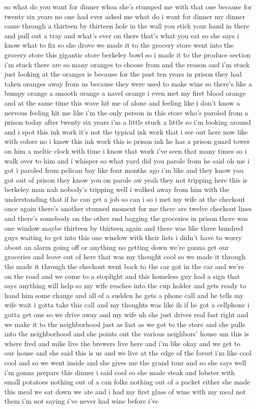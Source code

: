 so what do you want for dinner whoa she's stumped me with that one because for twenty six years no one had ever asked me what do i want for dinner my dinner came through a thirteen by thirteen hole in the wall you stick your hand in there and pull out a tray and what's ever on there that's what you eat so she says i know what to fix so she drove we made it to the grocery store went into the grocery store this gigantic store berkeley bowl so i made it to the produce section i'm stuck there are so many oranges to choose from and the reason and i'm stuck just looking at the oranges is because for the past ten years in prison they had taken oranges away from us because they were used to make wine so there's like a bumpy orange a smooth orange a navel orange i even met my first blood orange and at the same time this wave hit me of alone and feeling like i don't know a nervous feeling hit me like i'm the only person in this store who's paroled from a prison today after twenty six years i'm a little stuck a little so i'm looking around and i spot this ink work it's not the typical ink work that i see out here now like with colors no i know this ink work this is prison ink he has a prison guard tower on him a meltic clock with time i know that work i've seen that many times so i walk over to him and i whisper so what yard did you parole from he said oh me i got i paroled from pelican bay like four months ago i'm like and they know you got out of prison they know you on parole aw yeah they not tripping here this is berkeley man nah nobody's tripping well i walked away from him with the understanding that if he can get a job so can i so i met my wife at the checkout once again there's another stunned moment for me there are twelve checkout lines and there's somebody on the other end bagging the groceries in prison there was one window maybe thirteen by thirteen again and there was like three hundred guys waiting to get into this one window with their lists i didn't have to worry about an alarm going off or anything no getting down we're gonna get our groceries and leave out of here that was my thought cool so we made it through the made it through the checkout went back to the car got in the car and we're on the road and we come to a stoplight and this homeless guy had a sign that says anything will help so my wife reaches into the cup holder and gets ready to hand him some change and all of a sudden he gets a phone call and he tells my wife wait i gotta take this call and my thoughts was like ih if he got a cellphone i gotta get one so we drive away and my wife uh she just drives real fast right and we make it to the neighborhood just as fast as we got to the store and she pulls into the neighborhood and she points out the various neighbors' house um this is where fred and mike live the brewers live here and i'm like okay and we get to our house and she said this is us and we live at the edge of the forest i'm like cool cool and so we went inside and she gives me the grand tour and so she says well i'm gonna prepare this dinner i said cool so she made steak and lobster with small potatoes nothing out of a can folks nothing out of a packet either she made this meal we sat down we ate and i had my first glass of wine with my meal not them i'm not saying i've never had wine before i've 